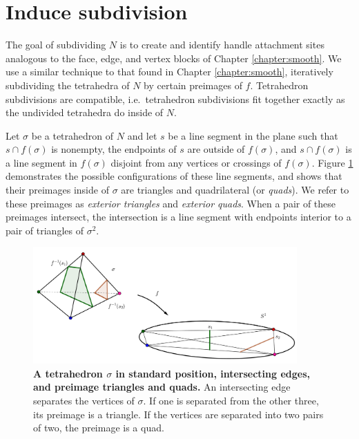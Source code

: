 \section{Induce subdivision}
\label{section:pl-subdivide}

The goal of subdividing $N$ is to create and identify handle attachment sites analogous to the face, edge, and vertex blocks of Chapter \ref{chapter:smooth}.
We use a similar technique to that found in Chapter \ref{chapter:smooth}, iteratively subdividing the tetrahedra of $N$ by certain preimages of $f$.
Tetrahedron subdivisions are compatible, i.e.\ tetrahedron subdivisions fit together exactly as the undivided tetrahedra do inside of $N$.

Let $\sigma$ be a tetrahedron of $N$ and let $s$ be a line segment in the plane such that $s\cap f(\sigma)$ is nonempty, the endpoints of $s$ are outside of $f(\sigma)$,  and $s\cap f(\sigma)$ is a line segment in $f(\sigma)$ disjoint from any vertices or crossings of $f(\sigma)$.
Figure \ref{fig:standard-position-intersection} demonstrates the possible configurations of these line segments, and shows that their preimages inside of $\sigma$ are triangles and quadrilateral (or \emph{quads}).
We refer to these preimages as \emph{exterior triangles} and \emph{exterior quads}.
When a pair of these preimages intersect, the intersection is a line segment with endpoints interior to a pair of triangles of $\sigma^2$.

\begin{figure}[h!]
	\centering
	\includegraphics[width=0.9\textwidth]{figures/standard-position-intersection.png}
	\caption{
		\textbf{A tetrahedron $\sigma$ in standard position, intersecting edges, and preimage triangles and quads.}
		An intersecting edge separates the vertices of $\sigma$.
		If one is separated from the other three, its preimage is a triangle.
		If the vertices are separated into two pairs of two, the preimage is a quad.
	}
	\label{fig:standard-position-intersection}
\end{figure}

